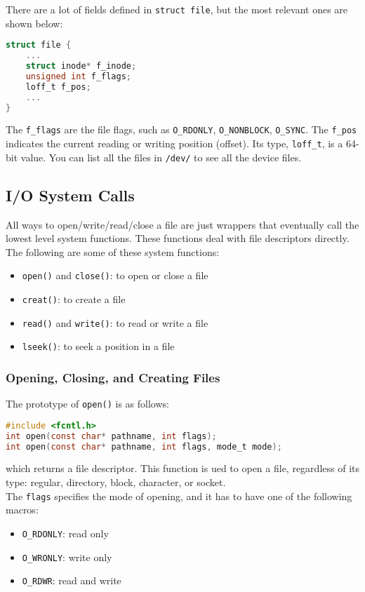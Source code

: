 \documentclass{article}
\renewcommand{\b}{\item[$\circ$]}
\newcommand{\newlist}{\begin{itemize}}
\renewcommand{\endlist}{\end{itemize}}
\newcommand{\code}[1]{\texttt{#1}}
\begin{document}
\noindent There are a lot of fields defined in \code{struct file}, but the most relevant ones are shown below: \\ 

\begin{lstlisting}[language=C]
struct file {
    ...
    struct inode* f_inode;
    unsigned int f_flags;
    loff_t f_pos;
    ...
}
\end{lstlisting}

\noindent The \code{f\_flags} are the file flags, such as \code{O\_RDONLY}, \code{O\_NONBLOCK}, \code{O\_SYNC}. The \code{f\_pos} indicates the current reading or writing position (offset). Its type, \code{loff\_t}, is a 64-bit value. You can list all the files in \code{/dev/} to see all the device files. 

\subsection{I/O System Calls}

All ways to open/write/read/close a file are just wrappers that eventually call the lowest level system functions. These functions deal with file descriptors directly. The following are some of these system functions:

\newlist
\b \code{open()} and \code{close()}: to open or close a file
\b \code{creat()}: to create a file 
\b \code{read()} and \code{write()}: to read or write a file
\b \code{lseek()}: to seek a position in a file
\endlist

\subsubsection{Opening, Closing, and Creating Files}

The prototype of \code{open()} is as follows:

\begin{lstlisting}[language=C]
#include <fcntl.h>
int open(const char* pathname, int flags);
int open(const char* pathname, int flags, mode_t mode);
\end{lstlisting}

\noindent which returns a file descriptor. This function is ued to open a file, regardless of its type: regular, directory, block, character, or socket. \\

\noindent The \code{flags} specifies the mode of opening, and it has to have one of the following macros:

\newlist
\b \code{O\_RDONLY}: read only
\b \code{O\_WRONLY}: write only
\b \code{O\_RDWR}: read and write
\endlist
\end{document}
